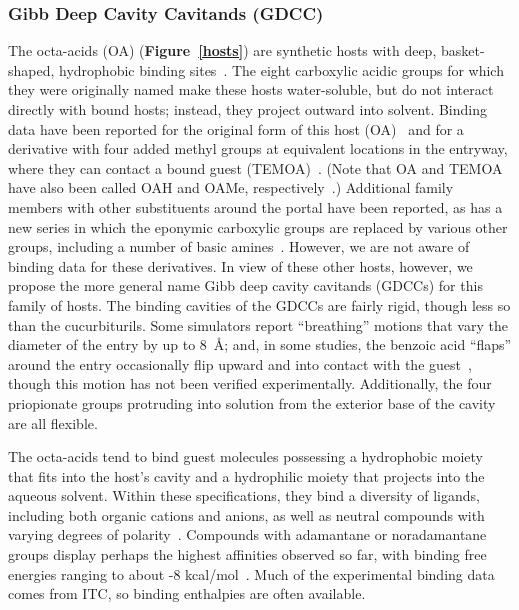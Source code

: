 \documentclass[aps,pre,twocolumn,nofootinbib,superscriptaddress,10pt, final,tightenlines]{revtex4-1}
\begin{document}
\subsubsection{Gibb Deep Cavity Cavitands (GDCC)}


The octa-acids (OA) ({\bf Figure~\ref{hosts}}) are synthetic hosts with deep, basket-shaped, hydrophobic binding sites~\cite{gibb_well-defined_2004}. 
The eight carboxylic acidic groups for which they were originally named make these hosts water-soluble, but do not interact directly with bound hosts; instead, they project outward into solvent. 
Binding data have been reported for the original form of this host (OA)~\cite{gibb_well-defined_2004} and for a derivative with four added methyl groups at equivalent locations in the entryway, where they can contact a bound guest (TEMOA)~\cite{gan_nonmonotonic_2011, sullivan_binding_2016}. 
(Note that OA and TEMOA have also been called OAH and OAMe, respectively~\cite{yin_sampl5_preprint}.) 
Additional family members with other substituents around the portal have been reported, as has a new series in which the eponymic carboxylic groups are replaced by various other groups, including a number of basic amines~\cite{hillyer_synthesis_2016}. 
However, we are not aware of binding data for these derivatives. 
In view of these other hosts, however, we propose the more general name Gibb deep cavity cavitands (GDCCs) for this family of hosts. 
The binding cavities of the GDCCs are fairly rigid, though less so than the cucurbiturils. 
Some simulators report ``breathing'' motions that vary the diameter of the entry by up to 8~\AA \cite{mikulskis_free-energy_2014}; and, in some studies, the benzoic acid ``flaps'' around the entry occasionally flip upward and into contact with the guest~\cite{yin_sampl5_2016, tofoleanu_absolute_2016}, though this motion has not been verified experimentally. 
Additionally, the four priopionate groups protruding into solution from the exterior base of the cavity are all flexible. 

The octa-acids tend to bind guest molecules possessing a hydrophobic moiety that fits into the host's cavity and a hydrophilic moiety that projects into the aqueous solvent.  
Within these specifications, they bind a diversity of ligands, including both organic cations and anions, as well as neutral compounds with varying degrees of polarity~\cite{gibb_guests_2009, gibb_binding_2013}.  
Compounds with adamantane or noradamantane groups display perhaps the highest affinities observed so far, with binding free energies ranging to about -8 kcal/mol~\cite{sun_calorimetric_2008}.  
Much of the experimental binding data comes from ITC, so binding enthalpies are often available. 
\end{document}

